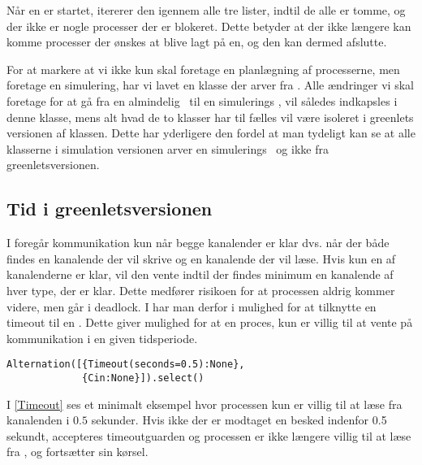 Når \sched en er startet, itererer den igennem alle tre lister, indtil de alle er tomme, og der ikke er nogle processer der er blokeret. Dette betyder at der ikke længere kan komme processer der ønskes at blive lagt på \sched en, og den kan dermed afslutte.

For at markere at vi ikke kun skal foretage en planlægning
af processerne, men foretage en simulering, har vi lavet en
 klasse der arver fra . Alle ændringer
vi skal foretage for at gå fra en almindelig \sched ~til en simulerings
\sched, vil således indkapsles i denne klasse, mens alt hvad de to
klasser har til fælles vil være isoleret i greenlets versionen af
 klassen. Dette har yderligere den fordel at man tydeligt kan se
at alle klasserne i simulation versionen arver en simulerings \sched ~og
ikke  fra greenletsversionen.


\subsection{Tid i greenletsversionen} I \pycsp foregår kommunikation
kun når begge kanalender er klar dvs. når der både findes en
kanalende der vil skrive og en kanalende der vil læse. Hvis
kun en af kanalenderne er klar, vil den vente indtil der findes
minimum en kanalende af hver type, der er klar. Dette medfører
risikoen for at processen aldrig kommer videre, men går i deadlock.
I \pycsp har man derfor i  mulighed for at
tilknytte en timeout til en . Dette giver mulighed for
at en proces, kun er villig til at vente på kommunikation i en
given tidsperiode. 
\begin{lstlisting}[float=hbtp, label=Timeout,caption=Timeout i Alternation (fra dokumentationen til PyCSP)]
Alternation([{Timeout(seconds=0.5):None}, 
             {Cin:None}]).select()
\end{lstlisting}

I \cref{Timeout} ses et minimalt eksempel hvor processen kun er villig
til at læse fra kanalenden  i $0.5$ sekunder. Hvis ikke der
er modtaget en besked indenfor 0.5 sekundt, accepteres timeoutguarden
og processen er ikke længere villig til at læse fra , og
fortsætter sin kørsel.

